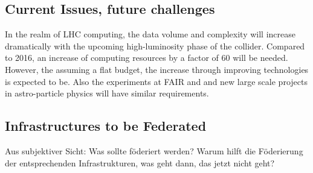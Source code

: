\subsection{Current Issues, future challenges}
In the realm of LHC computing, the data volume and complexity will
increase dramatically with the upcoming high-luminosity phase of the
collider. Compared to 2016, an increase of computing resources by a
factor of 60 will be needed. However, the assuming a flat budget, the
increase through improving technologies is expected to be. Also the
experiments at FAIR and and new large scale projects in astro-particle
physics will have similar requirements. 


\subsection{Infrastructures to be Federated}

Aus subjektiver Sicht: Was sollte föderiert werden?  Warum hilft die
Föderierung der entsprechenden Infrastrukturen, was geht dann, das
jetzt nicht geht?
